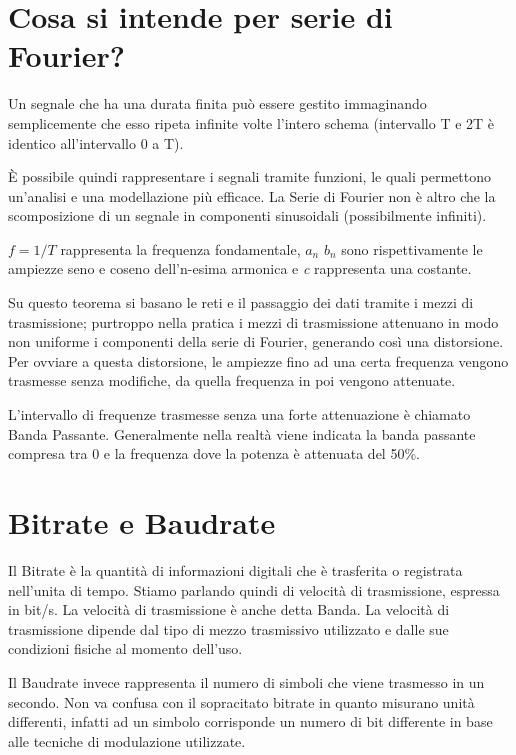 \section{Cosa si intende per serie di Fourier?}
Un segnale che ha una durata finita può essere gestito immaginando semplicemente che esso ripeta infinite volte l’intero schema (intervallo T e 2T è identico all’intervallo 0 a T).

È possibile quindi rappresentare i segnali tramite funzioni, le quali permettono un’analisi e una modellazione più efficace.
La Serie di Fourier non è altro che la scomposizione di un segnale in componenti sinusoidali (possibilmente infiniti).


$f=1/T$ rappresenta la frequenza fondamentale, $a_n$  $b_n$  sono rispettivamente le ampiezze seno e coseno dell’n-esima armonica e \textit{c} rappresenta una costante.

Su questo teorema si basano le reti e il passaggio dei dati tramite i mezzi di trasmissione; purtroppo 	nella pratica i mezzi di trasmissione attenuano in modo non uniforme i componenti della serie di Fourier, generando così una distorsione. Per ovviare a questa distorsione, le ampiezze fino ad una certa frequenza vengono trasmesse senza modifiche, da quella frequenza in poi vengono attenuate.

L’intervallo di frequenze trasmesse senza una forte attenuazione è chiamato Banda Passante.
Generalmente nella realtà viene indicata la banda passante compresa tra 0 e la frequenza dove la potenza è attenuata del 50\%.
\section{Bitrate e Baudrate}

Il Bitrate è la quantità di informazioni digitali che è trasferita o registrata nell’unita di tempo.
Stiamo parlando quindi di velocità di trasmissione, espressa in bit/s. La velocità di trasmissione è anche detta Banda. La velocità di trasmissione dipende dal tipo di mezzo trasmissivo utilizzato e dalle sue condizioni fisiche al momento dell’uso.

Il Baudrate invece rappresenta il numero di simboli che viene trasmesso in un secondo. Non va confusa con il sopracitato bitrate in quanto misurano unità differenti, infatti ad un simbolo corrisponde un numero di bit differente in base alle tecniche di modulazione utilizzate.

